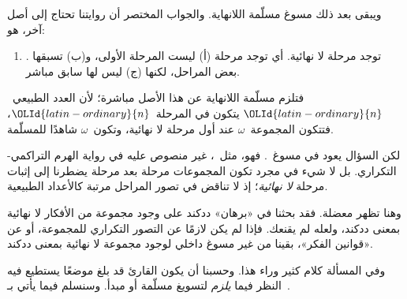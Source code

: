 \documentclass[../../../include/open-logic-section]{subfiles}
\begin{document}
ويبقى بعد ذلك مسوغ مسلّمة اللانهاية. والجواب المختصر أن روايتنا تحتاج
إلى أصل آخر، هو:
\begin{enumerate}
	\item[] \stagesinf. توجد مرحلة لا نهائية. أي توجد مرحلة (أ) ليست المرحلة الأولى، و(ب) تسبقها بعض المراحل، لكنها (ج) ليس لها سابق مباشر.
\end{enumerate}
فتلزم مسلّمة اللانهاية عن هذا الأصل مباشرة؛ لأن العدد الطبيعي~$\OLId{latin-ordinary}{n}$
يتكون في المرحلة~$\OLId{latin-ordinary}{n}$، فتتكون المجموعة~$\omega$ عند أول مرحلة لا
نهائية، وتكون~$\omega$ شاهدًا للمسلّمة.

لكن السؤال يعود في مسوغ~\stagesinf. فهو، مثل~\stagessucc، غير منصوص
عليه في رواية الهرم التراكمي-التكراري. بل لا شيء في مجرد تكون
المجموعات مرحلة بعد مرحلة يضطرنا إلى إثبات مرحلة \emph{لا نهائية}؛
إذ لا تناقض في تصور المراحل مرتبة كالأعداد الطبيعية.

وهنا تظهر معضلة. فقد بحثنا في
 «برهان» ددكند على وجود
مجموعة من الأفكار لا نهائية بمعنى ددكند، ولعله لم يقنعك. فإذا لم يكن
\stagesinf{} لازمًا عن التصور التكراري للمجموعة، أو عن «قوانين الفكر»،
بقينا من غير مسوغ داخلي لوجود مجموعة لا نهائية بمعنى ددكند.

وفي المسألة كلام كثير وراء هذا. وحسبنا أن يكون القارئ قد بلغ موضعًا
يستطيع فيه النظر فيما \emph{يلزم} لتسويغ مسلّمة أو مبدأ. وسنسلم فيما
يأتي بـ~\stagesinf{}.
\end{document}
